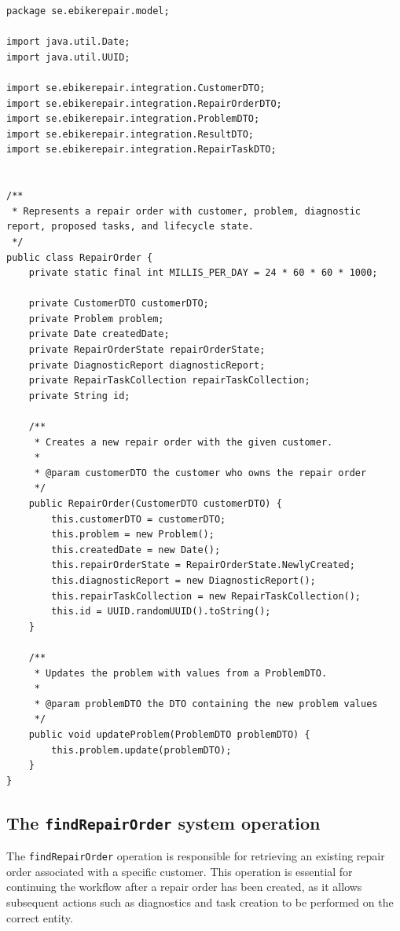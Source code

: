 \documentclass[a4paper]{scrartcl}
\begin{document}
\begin{lstlisting}[style=javastyle, caption={Main class entry point}]
    package se.ebikerepair.model;

import java.util.Date;
import java.util.UUID;

import se.ebikerepair.integration.CustomerDTO;
import se.ebikerepair.integration.RepairOrderDTO;
import se.ebikerepair.integration.ProblemDTO;
import se.ebikerepair.integration.ResultDTO;
import se.ebikerepair.integration.RepairTaskDTO;


/**
 * Represents a repair order with customer, problem, diagnostic report, proposed tasks, and lifecycle state.
 */
public class RepairOrder {
    private static final int MILLIS_PER_DAY = 24 * 60 * 60 * 1000;

    private CustomerDTO customerDTO;
    private Problem problem;
    private Date createdDate;
    private RepairOrderState repairOrderState;
    private DiagnosticReport diagnosticReport;
    private RepairTaskCollection repairTaskCollection;
    private String id;

    /**
     * Creates a new repair order with the given customer.
     *
     * @param customerDTO the customer who owns the repair order
     */
    public RepairOrder(CustomerDTO customerDTO) {
        this.customerDTO = customerDTO;
        this.problem = new Problem();
        this.createdDate = new Date();
        this.repairOrderState = RepairOrderState.NewlyCreated;
        this.diagnosticReport = new DiagnosticReport();
        this.repairTaskCollection = new RepairTaskCollection();
        this.id = UUID.randomUUID().toString();
    }

    /**
     * Updates the problem with values from a ProblemDTO.
     *
     * @param problemDTO the DTO containing the new problem values
     */
    public void updateProblem(ProblemDTO problemDTO) {
        this.problem.update(problemDTO);
    }
}

\end{lstlisting}

\subsection{The \texttt{findRepairOrder} system operation}

The \texttt{findRepairOrder} operation is responsible for retrieving an existing repair order associated with a specific customer. This operation is essential for continuing the workflow after a repair order has been created, as it allows subsequent actions such as diagnostics and task creation to be performed on the correct entity.
\end{document}
